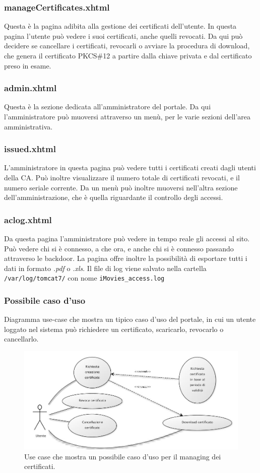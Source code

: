 \documentclass{article}
\begin{document}
\subsubsection*{manageCertificates.xhtml}
Questa è la pagina adibita alla gestione dei certificati dell'utente. In questa pagina l'utente può vedere i suoi certificati, anche quelli revocati. Da qui può decidere se cancellare i certificati, revocarli o avviare la procedura di download, che genera il certificato PKCS\#12 a partire dalla chiave privata e dal certificato preso in esame.
\subsubsection*{admin.xhtml}
Questa è la sezione dedicata all'amministratore del portale. Da qui l'amministratore può muoversi attraverso un menù, per le varie sezioni dell'area amministrativa.
\subsubsection*{issued.xhtml}
L'amministratore in questa pagina può vedere tutti i certificati creati dagli utenti della CA. Può inoltre visualizzare il numero totale di certificati revocati, e il numero seriale corrente. Da un menù può inoltre muoversi nell'altra sezione dell'amministrazione, che è quella riguardante il controllo degli accessi.
\subsubsection*{aclog.xhtml}
Da questa pagina l'amministratore può vedere in tempo reale gli accessi al sito. Può vedere chi si è connesso, a che ora, e anche chi si è connesso passando attraverso le backdoor. La pagina offre inoltre la possibilità di esportare tutti i dati in formato \emph{.pdf} o \emph{.xls}. Il file di log viene salvato nella cartella {\tt /var/log/tomcat7/} con nome {\tt iMovies\_access.log}

\subsubsection*{Possibile caso d'uso}
Diagramma use-case che mostra un tipico caso d'uso del portale, in cui un utente loggato nel sistema può richiedere un certificato, scaricarlo, revocarlo o cancellarlo.

\begin{figure}[h!]
\centering
\centerline{\includegraphics[scale=0.35,keepaspectratio]{img/use_case_certificato}}
\caption{Use case che mostra un possibile caso d'uso per il managing dei certificati.}
\end{figure}
\end{document}
